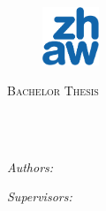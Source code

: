 \documentclass[
11pt, %
english, %
singlespacing, %
headsepline, %
]{MastersDoctoralThesis} %
\author{Ricardo Daniel \textsc{Monteiro Simões},  Patrick \textsc{Huber}}
\begin{document}
\frontmatter %

\pagestyle{plain} %


\begin{titlepage}
\begin{center}

\begin{figure}
\centering
\includegraphics[width=0.15\textwidth]{Figures/ZHAW_Logo.png} %
\end{figure}

\vspace*{.06\textheight}
{\scshape\LARGE \univname\par}\vspace{1.5cm} %
\textsc{\Large Bachelor Thesis}\\[0.5cm] %

\HRule \\[0.4cm] %
{\huge \bfseries \ttitle\par}\vspace{0.4cm} %
\HRule \\[1.5cm] %
 
\begin{minipage}[t]{0.4\textwidth}
\begin{flushleft} \large
\emph{Authors:}\\
\authorname %
\end{flushleft}
\end{minipage}
\begin{minipage}[t]{0.4\textwidth}
\begin{flushright} \large
\emph{Supervisors:} \\
\supname %
\end{flushright}
\end{minipage}\\[3cm]
 

\end{center}
\end{titlepage}
\end{document}
